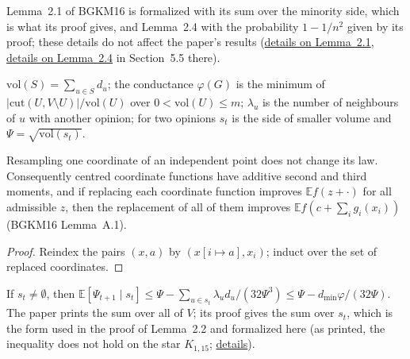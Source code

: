 Lemma~2.1 of BGKM16 is formalized with its sum over the minority side, which is what its proof
gives, and Lemma~2.4 with the probability $1-1/n^2$ given by its proof; these details do not
affect the paper's results
(\href{https://github.com/formal-dynamics/leanamics/blob/main/voter/FORMALIZATION_DIFFERENCES.md#51-lemma-21-of-bgkm16-the-sum-over-the-minority-side}{details
on Lemma~2.1},
\href{https://github.com/formal-dynamics/leanamics/blob/main/voter/FORMALIZATION_DIFFERENCES.md#5-consensus-time-via-conductance-berenbrinkgiakkoupiskermarrecmallmann-trenn}{details
on Lemma~2.4} in Section~5.5 there).
\begin{definition}\label{def:conductance}
\leanok
$\mathrm{vol}(S)=\sum_{u\in S}d_u$; the conductance $\varphi(G)$ is the minimum of
$|\mathrm{cut}(U,V\setminus U)|/\mathrm{vol}(U)$ over $0<\mathrm{vol}(U)\le m$; $\lambda_u$ is the
number of neighbours of $u$ with another opinion; for two opinions $s_t$ is the side of smaller
volume and $\Psi=\sqrt{\mathrm{vol}(s_t)}$.
\end{definition}
\begin{lemma}\label{lem:indep}
\leanok
Resampling one coordinate of an independent point does not change its law. Consequently
centred coordinate functions have additive second and third moments, and if replacing each
coordinate function improves $\mathbb{E}f(z+\cdot)$ for all admissible $z$, then the replacement of
all of them improves $\mathbb{E}f(c+\sum_i g_i(x_i))$ (BGKM16 Lemma~A.1).
\end{lemma}
\begin{proof}\leanok
Reindex the pairs $(x,a)$ by $(x[i\mapsto a],x_i)$; induct over the set of replaced coordinates.
\end{proof}
\begin{lemma}\label{lem:bgkm-21}
\leanok{}
If $s_t\neq\emptyset$, then
$\mathbb{E}[\Psi_{t+1}\mid s_t]\le\Psi-\sum_{u\in s_t}\lambda_u d_u/(32\Psi^3)
\le\Psi-d_{\min}\varphi/(32\Psi)$. The paper prints the sum over all of $V$; its proof gives the sum over $s_t$, which is the
form used in the proof of Lemma~2.2 and formalized here (as printed, the inequality does not
hold on the star $K_{1,15}$;
\href{https://github.com/formal-dynamics/leanamics/blob/main/voter/FORMALIZATION_DIFFERENCES.md#51-lemma-21-of-bgkm16-the-sum-over-the-minority-side}{details}).
\end{lemma}
